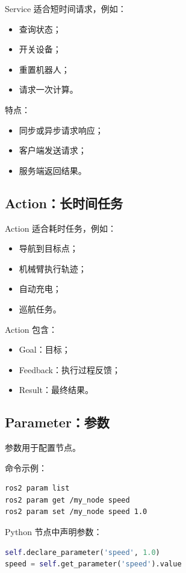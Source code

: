 \documentclass[UTF8,a4paper,12pt]{ctexart}
\begin{document}
Service 适合短时间请求，例如：
\begin{itemize}
    \item 查询状态；
    \item 开关设备；
    \item 重置机器人；
    \item 请求一次计算。
\end{itemize}

特点：
\begin{itemize}
    \item 同步或异步请求响应；
    \item 客户端发送请求；
    \item 服务端返回结果。
\end{itemize}

\subsection{Action：长时间任务}

Action 适合耗时任务，例如：
\begin{itemize}
    \item 导航到目标点；
    \item 机械臂执行轨迹；
    \item 自动充电；
    \item 巡航任务。
\end{itemize}

Action 包含：
\begin{itemize}
    \item Goal：目标；
    \item Feedback：执行过程反馈；
    \item Result：最终结果。
\end{itemize}

\subsection{Parameter：参数}

参数用于配置节点。

命令示例：

\begin{lstlisting}[language=bash]
ros2 param list
ros2 param get /my_node speed
ros2 param set /my_node speed 1.0
\end{lstlisting}

Python 节点中声明参数：

\begin{lstlisting}[language=Python]
self.declare_parameter('speed', 1.0)
speed = self.get_parameter('speed').value
\end{lstlisting}
\end{document}
